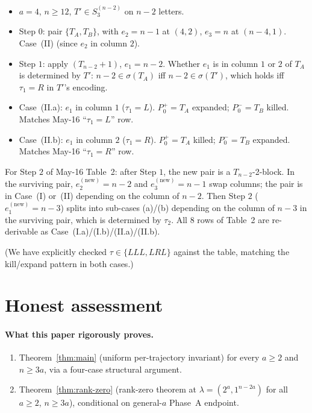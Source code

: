\documentclass[11pt]{article}
\theoremstyle{definition}
\begin{document}
\begin{itemize}[leftmargin=2em,topsep=0.3em,itemsep=0.2em]
\item $a=4$, $n\ge 12$, $T'\in S_3^{(n-2)}$ on $n-2$ letters.
\item Step $0$: pair $\{T_A,T_B\}$, with $e_2=n-1$ at $(4,2)$,
  $e_3=n$ at $(n-4,1)$.  Case~(II) (since $e_2$ in column $2$).
\item Step $1$: apply $(T_{n-2}{+}1)$, $e_1=n-2$.
  Whether $e_1$ is in column $1$ or $2$ of $T_A$ is determined by
  $T'$: $n-2\in\sigma(T_A)$ iff $n-2\in\sigma(T')$, which holds
  iff $\tau_1=R$ in $T'$'s encoding.
\item Case~(II.a):  $e_1$ in column $1$ ($\tau_1=L$).  $P_0^+=T_A$
  expanded; $P_0^-=T_B$ killed.  Matches May-16 ``$\tau_1=L$'' row.
\item Case~(II.b):  $e_1$ in column $2$ ($\tau_1=R$).  $P_0^+=T_A$
  killed; $P_0^-=T_B$ expanded.  Matches May-16 ``$\tau_1=R$'' row.
\end{itemize}

For Step $2$ of May-16 Table~2: after Step $1$, the new pair is a
$T_{n-2}$-2-block.  In the surviving pair, $e_2^{(\text{new})}=n-2$
and $e_3^{(\text{new})}=n-1$ swap columns; the pair is in Case~(I)
or~(II) depending on the column of $n-2$.  Then Step $2$
($e_1^{(\text{new})}=n-3$) splits into sub-cases (a)/(b)
depending on the column of $n-3$ in the surviving pair, which is
determined by $\tau_2$.  All $8$ rows of Table~2 are
re-derivable as Case~(I.a)/(I.b)/(II.a)/(II.b).

(We have explicitly checked $\tau\in\{LLL,LRL\}$ against the table,
matching the kill/expand pattern in both cases.)

\section{Honest assessment}\label{sec:honest}

\paragraph{What this paper rigorously proves.}
\begin{enumerate}[leftmargin=2em,topsep=0.3em,itemsep=0.2em]
\item Theorem~\ref{thm:main} (uniform per-trajectory invariant)
for every $a\ge 2$ and $n\ge 3a$, via a four-case structural
argument.
\item Theorem~\ref{thm:rank-zero} (rank-zero theorem at
$\lambda=(2^a,1^{n-2a})$ for all $a\ge 2$, $n\ge 3a$), conditional
on general-$a$ Phase~A endpoint.
\end{enumerate}
\end{document}
